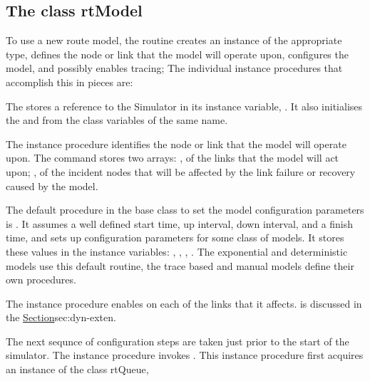 \subsection{The class rtModel}
\label{sec:rtmodel}

To use a new route model, the routine 
creates an instance of the appropriate type,
defines the node or link that the model will operate upon,
configures the model,
and possibly enables tracing;
The individual instance procedures that accomplish this in pieces are:
\begin{list}{}{}
\item The 
  stores a reference to the Simulator in its instance variable, .
  It also initialises the  and 
  from the class variables of the same name.
\item The instance procedure 
  identifies the node or link that the model will operate upon.
  The command stores two arrays: , of the links that the
  model will act upon; , of the incident nodes
  that will be affected by the link failure or recovery caused by the model.
\item The default procedure in the base class
   to set the model configuration parameters is
  .
  It assumes a well defined
  start time, up interval, down interval, and a finish time,
  and sets up configuration parameters for some class of models.
  It stores these values in the instance variables:
  , , ,
  .
    The exponential and deterministic models use this default routine,
  the trace based and manual models define their own procedures.
\item %
  The instance procedure
  enables  on each of the links that it affects.
   is discussed in the
  \href{section on extensions to the class Link}{Section}{sec:dyn-exten}.
\end{list}
The next sequnce of configuration steps are taken just prior to
the start of the simulator.
The instance procedure  invokes
.
This instance procedure first acquires an instance of the class rtQueue,
